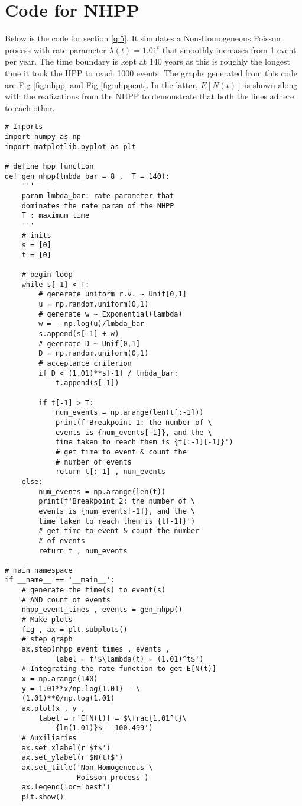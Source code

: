 \documentclass[%
 reprint,
 amsmath,amssymb,
 aps,
]{revtex4-2}
\theoremstyle{definition}
\begin{document}
\section{\label{app:nhppcode}Code for NHPP}
Below is the code for section \ref{q:5}. It simulates a Non-Homogeneous Poisson process with rate parameter $\lambda(t)=1.01^t$ that smoothly increases from 1 event per year. The time boundary is kept at 140 years as this is roughly the longest time it took the HPP to reach 1000 events. The graphs generated from this code are Fig \ref{fig:nhpp} and Fig \ref{fig:nhppent}. In the latter, $E[N(t)]$ is shown along with the realizations from the NHPP to demonstrate	 that both the lines adhere to each other.
\begin{verbatim}
# Imports
import numpy as np
import matplotlib.pyplot as plt

# define hpp function
def gen_nhpp(lmbda_bar = 8 ,  T = 140):
    '''
    param lmbda_bar: rate parameter that 
    dominates the rate param of the NHPP
    T : maximum time
    '''
    # inits
    s = [0]
    t = [0]

    # begin loop
    while s[-1] < T:
        # generate uniform r.v. ~ Unif[0,1]
        u = np.random.uniform(0,1)
        # generate w ~ Exponential(lambda) 
        w = - np.log(u)/lmbda_bar 
        s.append(s[-1] + w)
        # geenrate D ~ Unif[0,1]
        D = np.random.uniform(0,1)
        # acceptance criterion
        if D < (1.01)**s[-1] / lmbda_bar:
            t.append(s[-1])
        
        if t[-1] > T:
            num_events = np.arange(len(t[:-1]))
            print(f'Breakpoint 1: the number of \
            events is {num_events[-1]}, and the \
            time taken to reach them is {t[:-1][-1]}')
            # get time to event & count the 
            # number of events
            return t[:-1] , num_events
    else:
        num_events = np.arange(len(t))
        print(f'Breakpoint 2: the number of \
        events is {num_events[-1]}, and the \
        time taken to reach them is {t[-1]}')
        # get time to event & count the number 
        # of events
        return t , num_events

# main namespace
if __name__ == '__main__': 
    # generate the time(s) to event(s) 
    # AND count of events
    nhpp_event_times , events = gen_nhpp() 
    # Make plots
    fig , ax = plt.subplots()
    # step graph
    ax.step(nhpp_event_times , events , 
            label = f'$\lambda(t) = (1.01)^t$') 
    # Integrating the rate function to get E[N(t)]
    x = np.arange(140)
    y = 1.01**x/np.log(1.01) - \
    (1.01)**0/np.log(1.01)
    ax.plot(x , y , 
    	label = r'E[N(t)] = $\frac{1.01^t}\
            {ln(1.01)}$ - 100.499')
    # Auxiliaries
    ax.set_xlabel(r'$t$')
    ax.set_ylabel(r'$N(t)$')
    ax.set_title('Non-Homogeneous \
                 Poisson process')
    ax.legend(loc='best')
    plt.show()

\end{verbatim}

\nocite{*}

\end{document}
